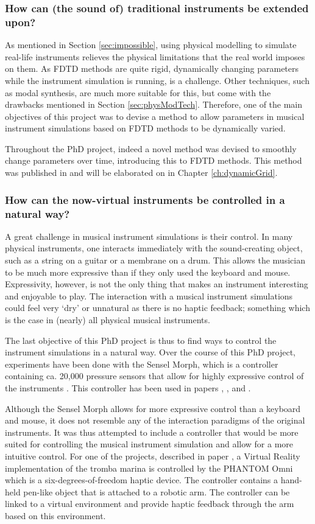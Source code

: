 \subsubsection{How can (the sound of) traditional instruments be extended upon?}
As mentioned in Section \ref{sec:impossible}, using physical modelling to simulate real-life instruments relieves the physical limitations that the real world imposes on them.
As FDTD methods are quite rigid, dynamically changing parameters while the instrument simulation is running, is a challenge. Other techniques, such as modal synthesis, are much more suitable for this, but come with the drawbacks mentioned in Section \ref{sec:physModTech}. Therefore, one of the main objectives of this project was to devise a method to allow parameters in musical instrument simulations based on FDTD methods to be dynamically varied.

Throughout the PhD project, indeed a novel method was devised to smoothly change parameters over time, introducing this to FDTD methods. This method was published in \citeP[G] and will be elaborated on in Chapter \ref{ch:dynamicGrid}.

\subsubsection{How can the now-virtual instruments be controlled in a natural way?}

A great challenge in musical instrument simulations is their control. In many physical instruments, one interacts immediately with the sound-creating object, such as a string on a guitar or a membrane on a drum. This allows the musician to be much more expressive than if they only used the keyboard and mouse. 
Expressivity, however, is not the only thing that makes an instrument interesting and enjoyable to play. The interaction with a musical instrument simulations could feel very `dry' or unnatural as there is no haptic feedback; something which is the case in (nearly) all physical musical instruments. 

The last objective of this PhD project is thus to find ways to control the instrument simulations in a natural way. 
Over the course of this PhD project, experiments have been done with the Sensel Morph, which is a controller containing ca. 20,000 pressure sensors that allow for highly expressive control of the instruments \cite{sensel}. This controller has been used in papers \citeP[A], \citeP[B], \citeP[C] and \citeP[D].

Although the Sensel Morph allows for more expressive control than a keyboard and mouse, it does not resemble any of the interaction paradigms of the original instruments. It was thus attempted to include a controller that would be more suited for controlling the musical instrument simulation and allow for a more intuitive control.
For one of the projects, described in paper \citeP[E], a Virtual Reality implementation of the tromba marina is controlled by the PHANTOM Omni \cite{phantom} which is a six-degrees-of-freedom haptic device. The controller contains a hand-held pen-like object that is attached to a robotic arm. The controller can be linked to a virtual environment and provide haptic feedback through the arm based on this environment. 

